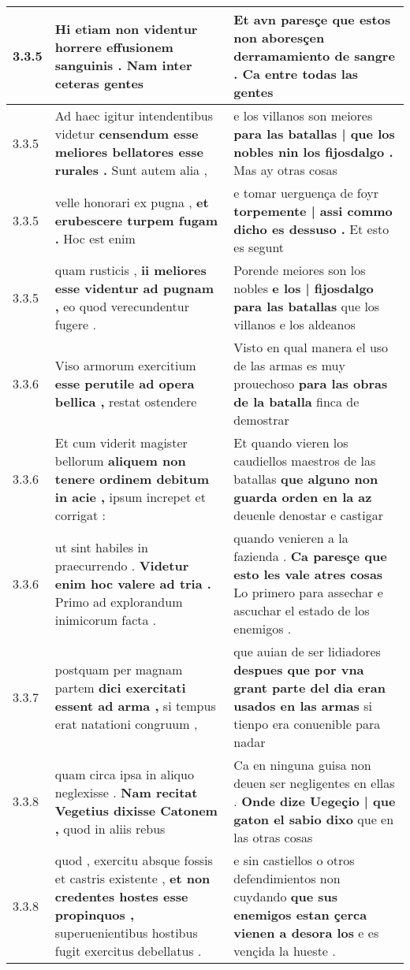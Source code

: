 \begin{tabular}{|p{1cm}|p{6.5cm}|p{6.5cm}|}
3.3.5 & Hi etiam non videntur \textbf{ horrere effusionem sanguinis . } Nam inter ceteras gentes & Et avn paresçe \textbf{ que estos non aboresçen derramamiento de sangre . } Ca entre todas las gentes \\\hline
3.3.5 & Ad haec igitur intendentibus videtur \textbf{ censendum esse meliores bellatores esse rurales . } Sunt autem alia , & e los villanos son meiores \textbf{ para las batallas | que los nobles nin los fijosdalgo . } Mas ay otras cosas \\\hline
3.3.5 & velle honorari ex pugna , \textbf{ et erubescere turpem fugam . } Hoc est enim & e tomar uerguença de foyr \textbf{ torpemente | assi commo dicho es dessuso . } Et esto es segunt \\\hline
3.3.5 & quam rusticis , \textbf{ ii meliores esse videntur ad pugnam , } eo quod verecundentur fugere . & Porende meiores son los nobles \textbf{ e los | fijosdalgo para las batallas } que los villanos e los aldeanos \\\hline
3.3.6 & Viso armorum exercitium \textbf{ esse perutile ad opera bellica , } restat ostendere & Visto en qual manera el uso de las armas es muy prouechoso \textbf{ para las obras de la batalla } finca de demostrar \\\hline
3.3.6 & Et cum viderit magister bellorum \textbf{ aliquem non tenere ordinem debitum in acie , } ipsum increpet et corrigat : & Et quando vieren los caudiellos maestros de las batallas \textbf{ que alguno non guarda orden en la az } deuenle denostar e castigar \\\hline
3.3.6 & ut sint habiles in praecurrendo . \textbf{ Videtur enim hoc valere ad tria . } Primo ad explorandum inimicorum facta . & quando venieren a la fazienda . \textbf{ Ca paresçe que esto les vale atres cosas } Lo primero para assechar e ascuchar el estado de los enemigos . \\\hline
3.3.7 & postquam per magnam partem \textbf{ dici exercitati essent ad arma , } si tempus erat natationi congruum , & que auian de ser lidiadores \textbf{ despues que por vna grant parte del dia eran usados en las armas } si tienpo era conuenible para nadar \\\hline
3.3.8 & quam circa ipsa in aliquo neglexisse . \textbf{ Nam recitat Vegetius dixisse Catonem , } quod in aliis rebus & Ca en ninguna guisa non deuen ser negligentes en ellas . \textbf{ Onde dize Uegeçio | que gaton el sabio dixo } que en las otras cosas \\\hline
3.3.8 & quod , exercitu absque fossis et castris existente , \textbf{ et non credentes hostes esse propinquos , } superuenientibus hostibus fugit exercitus debellatus . & e sin castiellos o otros defendimientos non cuydando \textbf{ que sus enemigos estan çerca vienen a desora los } e es vençida la hueste . \\\hline

\end{tabular}
